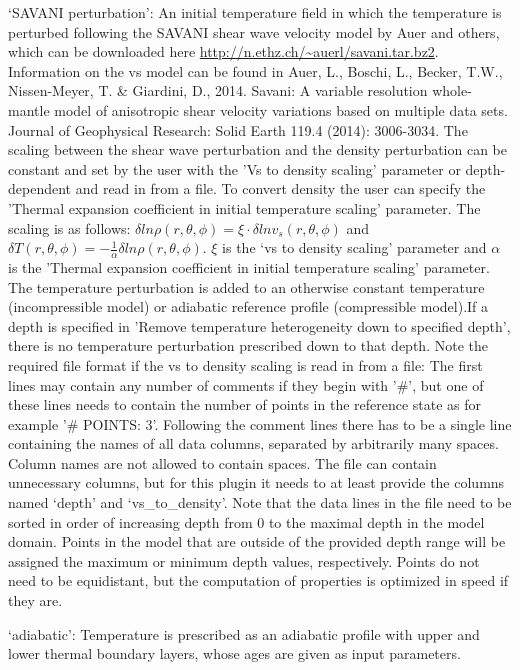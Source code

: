 \begin{itemize}
`SAVANI perturbation': An initial temperature field in which the temperature is perturbed following the SAVANI shear wave velocity model by Auer and others, which can be downloaded here \url{http://n.ethz.ch/~auerl/savani.tar.bz2}. Information on the vs model can be found in Auer, L., Boschi, L., Becker, T.W., Nissen-Meyer, T. \& Giardini, D., 2014. Savani: A variable resolution whole-mantle model of anisotropic shear velocity variations based on multiple data sets. Journal of Geophysical Research: Solid Earth 119.4 (2014): 3006-3034. The scaling between the shear wave perturbation and the density perturbation can be constant and set by the user with the 'Vs to density scaling' parameter or depth-dependent and read in from a file. To convert density the user can specify the 'Thermal expansion coefficient in initial temperature scaling' parameter. The scaling is as follows: $\delta ln \rho (r,\theta,\phi) = \xi \cdot \delta ln v_s(r,\theta, \phi)$ and $\delta T(r,\theta,\phi) = - \frac{1}{\alpha} \delta ln \rho(r,\theta,\phi)$. $\xi$ is the `vs to density scaling' parameter and $\alpha$ is the 'Thermal expansion coefficient in initial temperature scaling' parameter. The temperature perturbation is added to an otherwise constant temperature (incompressible model) or adiabatic reference profile (compressible model).If a depth is specified in 'Remove temperature heterogeneity down to specified depth', there is no temperature perturbation prescribed down to that depth.
Note the required file format if the vs to density scaling is read in from a file: The first lines may contain any number of comments if they begin with '\#', but one of these lines needs to contain the number of points in the reference state as for example '\# POINTS: 3'. Following the comment lines there has to be a single line containing the names of all data columns, separated by arbitrarily many spaces. Column names are not allowed to contain spaces. The file can contain unnecessary columns, but for this plugin it needs to at least provide the columns named `depth' and `vs\_to\_density'. Note that the data lines in the file need to be sorted in order of increasing depth from 0 to the maximal depth in the model domain. Points in the model that are outside of the provided depth range will be assigned the maximum or minimum depth values, respectively. Points do not need to be equidistant, but the computation of properties is optimized in speed if they are.

`adiabatic': Temperature is prescribed as an adiabatic profile with upper and lower thermal boundary layers, whose ages are given as input parameters.


\end{itemize}

